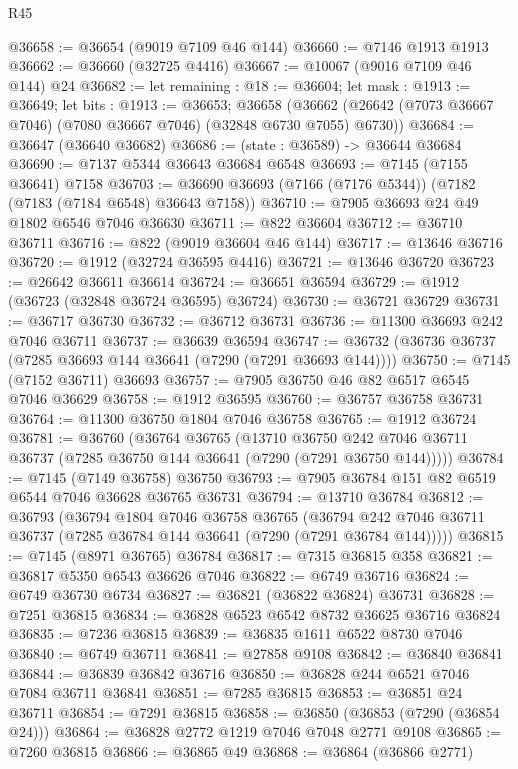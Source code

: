 \begin{lexlean}{R45}
\begin{coremodule}
{@36658 := @36654 (@9019 @7109 @46 @144)
@36660 := @7146 @1913 @1913
@36662 := @36660 (@32725 @4416)
@36667 := @10067 (@9016 @7109 @46 @144) @24
@36682 := let remaining : @18 := @36604;
  let mask : @1913 := @36649;
  let bits : @1913 := @36653;
  @36658 (@36662 (@26642 (@7073 @36667 @7046) (@7080 @36667 @7046) (@32848 @6730 @7055) @6730))
@36684 := @36647 (@36640 @36682)
@36686 := (state : @36589) -> @36644 @36684
@36690 := @7137 @5344 @36643 @36684 @6548
@36693 := @7145 (@7155 @36641) @7158
@36703 := @36690 @36693 (@7166 (@7176 @5344)) (@7182 (@7183 (@7184 @6548) @36643 @7158))
@36710 := @7905 @36693 @24 @49 @1802 @6546 @7046 @36630
@36711 := @822 @36604
@36712 := @36710 @36711
@36716 := @822 (@9019 @36604 @46 @144)
@36717 := @13646 @36716
@36720 := @1912 (@32724 @36595 @4416)
@36721 := @13646 @36720
@36723 := @26642 @36611 @36614
@36724 := @36651 @36594
@36729 := @1912 (@36723 (@32848 @36724 @36595) @36724)
@36730 := @36721 @36729
@36731 := @36717 @36730
@36732 := @36712 @36731
@36736 := @11300 @36693 @242 @7046 @36711
@36737 := @36639 @36594
@36747 := @36732 (@36736 @36737 (@7285 @36693 @144 @36641 (@7290 (@7291 @36693 @144))))
@36750 := @7145 (@7152 @36711) @36693
@36757 := @7905 @36750 @46 @82 @6517 @6545 @7046 @36629
@36758 := @1912 @36595
@36760 := @36757 @36758 @36731
@36764 := @11300 @36750 @1804 @7046 @36758
@36765 := @1912 @36724
@36781 := @36760
    (@36764
      @36765
      (@13710
        @36750
        @242
        @7046
        @36711
        @36737
        (@7285 @36750 @144 @36641 (@7290 (@7291 @36750 @144)))))
@36784 := @7145 (@7149 @36758) @36750
@36793 := @7905 @36784 @151 @82 @6519 @6544 @7046 @36628 @36765 @36731
@36794 := @13710 @36784
@36812 := @36793
    (@36794
      @1804
      @7046
      @36758
      @36765
      (@36794 @242 @7046 @36711 @36737 (@7285 @36784 @144 @36641 (@7290 (@7291 @36784 @144)))))
@36815 := @7145 (@8971 @36765) @36784
@36817 := @7315 @36815 @358
@36821 := @36817 @5350 @6543 @36626 @7046
@36822 := @6749 @36716
@36824 := @6749 @36730 @6734
@36827 := @36821 (@36822 @36824) @36731
@36828 := @7251 @36815
@36834 := @36828 @6523 @6542 @8732 @36625 @36716 @36824
@36835 := @7236 @36815
@36839 := @36835 @1611 @6522 @8730 @7046
@36840 := @6749 @36711
@36841 := @27858 @9108
@36842 := @36840 @36841
@36844 := @36839 @36842 @36716
@36850 := @36828 @244 @6521 @7046 @7084 @36711 @36841
@36851 := @7285 @36815
@36853 := @36851 @24 @36711
@36854 := @7291 @36815
@36858 := @36850 (@36853 (@7290 (@36854 @24)))
@36864 := @36828 @2772 @1219 @7046 @7048 @2771 @9108
@36865 := @7260 @36815
@36866 := @36865 @49
@36868 := @36864 (@36866 @2771)
}
\end{coremodule}
\end{lexlean}
